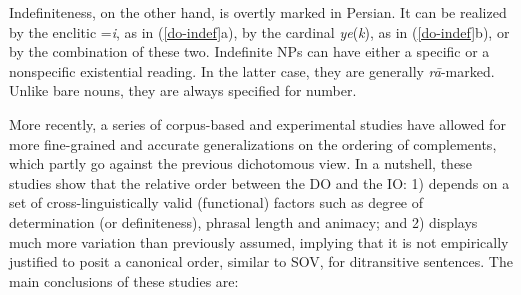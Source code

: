 \documentclass[output=paper]{langsci/langscibook}
\begin{document}
Indefiniteness, on the other hand, is overtly marked in Persian. It can be realized by the enclitic =\textit{i}, as in (\ref{do-indef}a), by the cardinal \textit{ye}(\textit{k}), as in (\ref{do-indef}b), or by the combination of these two. Indefinite NPs can have either a specific or a nonspecific existential reading. In the latter case, they are generally \textit{r\=a}-marked. Unlike bare nouns, they are always specified for number.

\begin{exe}
	\ex\label{do-indef}
	\begin{xlist}
		
		
		
	\end{xlist}
\end{exe}


More recently, a series of corpus-based and experimental studies \citep{FaghiriPhd,FagSam2014,FagSamHem2014,FagSamHem2018} have allowed for more fine-grained and accurate generalizations on the ordering of complements, which partly go against the previous dichotomous view. 
In a nutshell, these studies show that the relative order between the DO and the IO: 1) depends on a set of cross-linguistically valid (functional) factors such as degree of determination (or definiteness), phrasal length and animacy; and 2) displays much more variation than previously assumed, implying that it is not empirically justified to posit a canonical order, similar to SOV, for ditransitive sentences.
The main conclusions of these studies are:
\end{document}
